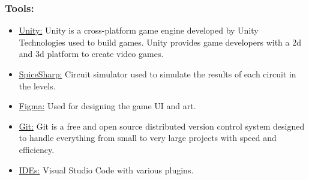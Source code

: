 \documentclass[../main.tex]{subfiles}
\begin{document}
\subsubsection{Tools:} 
\begin{itemize}
    \item \underline{Unity:} Unity is a cross-platform game engine developed by Unity Technologies used to build games. Unity provides game developers with a \acrshort{2d} and  \acrshort{3d} platform to create video games.
    \item \underline{SpiceSharp:} Circuit simulator used to simulate the results of each circuit in the levels. 
     \item \underline{Figma:} Used for designing the game \acrshort{UI} and art.
      \item \underline{Git:} Git is a free and open source distributed version control system designed to handle everything from small to very large projects with speed and efficiency.
      \item \underline{IDEs:} Visual Studio Code with various plugins.
\end{itemize}
\end{document}
